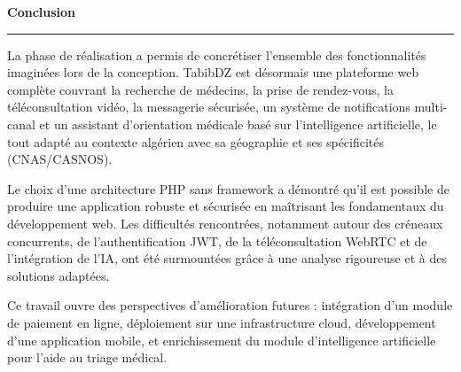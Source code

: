 \documentclass[12pt,a4paper]{report}
\begin{document}
\begin{center}
{\Huge\bfseries\color{primaryblue} Conclusion}

\vspace{0.3cm}

{\color{primaryblue}\rule{0.5\textwidth}{1.2pt}}
\end{center}

\vspace{0.8cm}


La phase de r\'ealisation a permis de concr\'etiser l'ensemble des fonctionnalit\'es imagin\'ees lors de la conception. TabibDZ est d\'esormais une plateforme web compl\`ete couvrant la recherche de m\'edecins, la prise de rendez-vous, la t\'el\'econsultation vid\'eo, la messagerie s\'ecuris\'ee, un syst\`eme de notifications multi-canal et un assistant d'orientation m\'edicale bas\'e sur l'intelligence artificielle, le tout adapt\'e au contexte alg\'erien avec sa g\'eographie et ses sp\'ecificit\'es (CNAS/CASNOS).

Le choix d'une architecture PHP sans framework a d\'emontr\'e qu'il est possible de produire une application robuste et s\'ecuris\'ee en ma\^itrisant les fondamentaux du d\'eveloppement web. Les difficult\'es rencontr\'ees, notamment autour des cr\'eneaux concurrents, de l'authentification JWT, de la t\'el\'econsultation WebRTC et de l'int\'egration de l'IA, ont \'et\'e surmount\'ees gr\^ace \`a une analyse rigoureuse et \`a des solutions adapt\'ees.

Ce travail ouvre des perspectives d'am\'elioration futures : int\'egration d'un module de paiement en ligne, d\'eploiement sur une infrastructure cloud, d\'eveloppement d'une application mobile, et enrichissement du module d'intelligence artificielle pour l'aide au triage m\'edical.

\vspace*{\fill}
\end{document}
